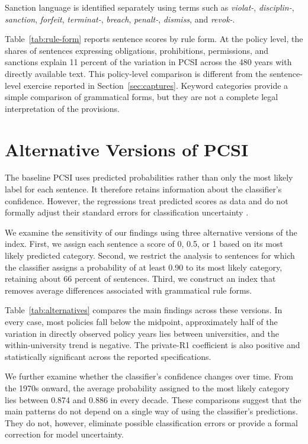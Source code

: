 \documentclass[11pt]{article}
\begin{document}
Sanction language is identified separately using terms such as \emph{violat-}, \emph{disciplin-}, \emph{sanction}, \emph{forfeit}, \emph{terminat-}, \emph{breach}, \emph{penalt-}, \emph{dismiss}, and \emph{revok-}.

Table~\ref{tab:rule-form} reports sentence scores by rule form. At the policy level, the shares of sentences expressing obligations, prohibitions, permissions, and sanctions explain 11 percent of the variation in PCSI across the 480 years with directly available text. This policy-level comparison is different from the sentence-level exercise reported in Section~\ref{sec:captures}. Keyword categories provide a simple comparison of grammatical forms, but they are not a complete legal interpretation of the provisions.



\section{Alternative Versions of PCSI}\label{app:uncertainty}
\setcounter{table}{0}

The baseline PCSI uses predicted probabilities rather than only the most likely label for each sentence. It therefore retains information about the classifier's confidence. However, the regressions treat predicted scores as data and do not formally adjust their standard errors for classification uncertainty \citep{egami2023using,battaglia2024inference}.

We examine the sensitivity of our findings using three alternative versions of the index. First, we assign each sentence a score of 0, 0.5, or 1 based on its most likely predicted category. Second, we restrict the analysis to sentences for which the classifier assigns a probability of at least 0.90 to its most likely category, retaining about 66 percent of sentences. Third, we construct an index that removes average differences associated with grammatical rule forms.

Table~\ref{tab:alternatives} compares the main findings across these versions. In every case, most policies fall below the midpoint, approximately half of the variation in directly observed policy years lies between universities, and the within-university trend is negative. The private-R1 coefficient is also positive and statistically significant across the reported specifications.

We further examine whether the classifier's confidence changes over time. From the 1970s onward, the average probability assigned to the most likely category lies between 0.874 and 0.886 in every decade. These comparisons suggest that the main patterns do not depend on a single way of using the classifier's predictions. They do not, however, eliminate possible classification errors or provide a formal correction for model uncertainty.


\end{document}
